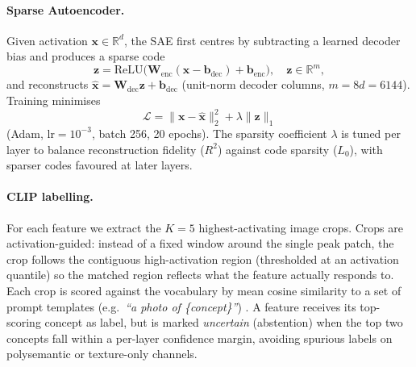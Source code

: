 \paragraph{Sparse Autoencoder.}
Given activation $\mathbf{x}\!\in\!\mathbb{R}^d$, the SAE first centres by subtracting a learned decoder bias and produces a sparse code
\begin{equation}
  \mathbf{z} = \text{ReLU}\!\bigl(\mathbf{W}_\text{enc}(\mathbf{x} - \mathbf{b}_\text{dec}) + \mathbf{b}_\text{enc}\bigr),\quad \mathbf{z}\!\in\!\mathbb{R}^m,
\end{equation}
and reconstructs $\hat{\mathbf{x}} = \mathbf{W}_\text{dec}\mathbf{z} + \mathbf{b}_\text{dec}$ (unit-norm decoder columns, $m{=}8d{=}6144$). Training minimises
\begin{equation}
  \mathcal{L} = \|\mathbf{x}-\hat{\mathbf{x}}\|_2^2 + \lambda\|\mathbf{z}\|_1
\end{equation}
(Adam, lr$\!=\!10^{-3}$, batch 256, 20 epochs). The sparsity coefficient $\lambda$ is tuned per layer to balance reconstruction fidelity ($R^2$) against code sparsity ($L_0$), with sparser codes favoured at later layers.

\paragraph{CLIP labelling.}
For each feature we extract the $K{=}5$ highest-activating image crops. Crops are activation-guided: instead of a fixed window around the single peak patch, the crop follows the contiguous high-activation region (thresholded at an activation quantile) so the matched region reflects what the feature actually responds to. Each crop is scored against the vocabulary by mean cosine similarity to a set of prompt templates (e.g.\ \textit{``a photo of \{concept\}''}) \cite{Radford2021}. A feature receives its top-scoring concept as label, but is marked \emph{uncertain} (abstention) when the top two concepts fall within a per-layer confidence margin, avoiding spurious labels on polysemantic or texture-only channels.

